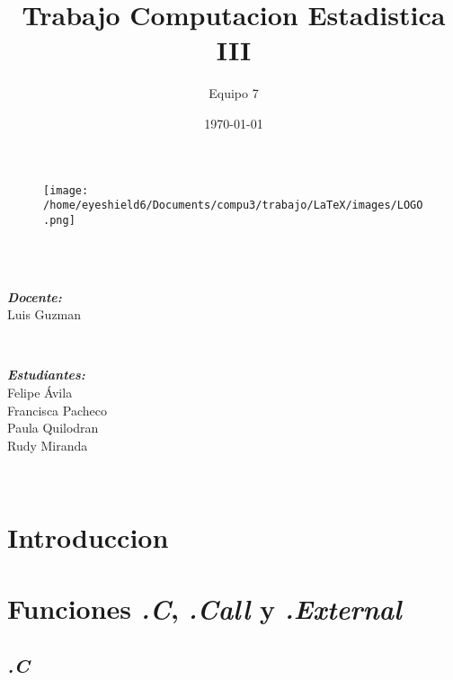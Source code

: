 \documentclass{article}
\title{Trabajo Computacion Estadistica III}
\author{Equipo 7}
\date{\today}
\begin{document}
    \begin{figure}
        \texttt{[image: /home/eyeshield6/Documents/compu3/trabajo/LaTeX/images/LOGO.png]}
    \end{figure}
    \begin{center}
        \\[0.2cm]
        \\[1cm]
        \begin{minipage}{0.4\textwidth}
            \begin{flushleft} \large
                \emph{\textbf{Docente:}}\\
                \textup{Luis Guzman}
            \end{flushleft}
        \end{minipage}
        ~
        \begin{minipage}{0.4\textwidth}
            \begin{flushright} \large
                \emph{\textbf{Estudiantes:}} \\
                \textup{Felipe \'Avila}\\
                \textup{Francisca Pacheco}\\
                \textup{Paula Quilodran}\\
                \textup{Rudy Miranda}
            \end{flushright}
        \end{minipage}\\[1cm]
        \makeatother
    \end{center}
    
    \tableofcontents

    \listoffigures

    \listoftables

    \section{Introduccion}

    \section{Funciones \textit{.C}, \textit{.Call} y \textit{.External}}

    \subsection{\textit{.C}}
    
\end{document}
